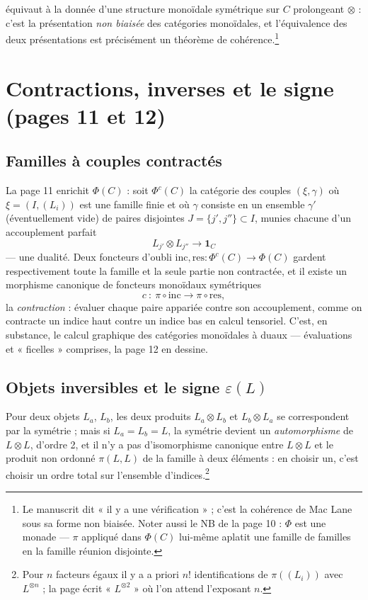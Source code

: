 \documentclass[11pt,a4paper]{article}
\begin{document}
équivaut à la donnée d'une structure monoïdale symétrique sur $C$
prolongeant $\otimes$ : c'est la présentation \emph{non biaisée} des
catégories monoïdales, et l'équivalence des deux présentations est
précisément un théorème de cohérence.\footnote{Le manuscrit dit « il y a
une vérification » ; c'est la cohérence de Mac Lane sous sa forme non
biaisée. Noter aussi le NB de la page 10 : $\Phi$ est une monade —
$\pi$ appliqué dans $\Phi(C)$ lui-même aplatit une famille de familles en
la famille réunion disjointe.}

\section*{Contractions, inverses et le signe (pages 11 et 12)}

\subsection*{Familles à couples contractés}

La page 11 enrichit $\Phi(C)$ : soit $\Phi^{c}(C)$ la catégorie des
couples $(\xi, \gamma)$ où $\xi = (I, (L_i))$ est une famille finie et où
$\gamma$ consiste en un ensemble $\gamma'$ (éventuellement vide) de paires
disjointes $J = \{j', j''\} \subset I$, munies chacune d'un accouplement
parfait
\[
L_{j'} \otimes L_{j''} \longrightarrow \mathbf{1}_C
\]
— une dualité. Deux foncteurs d'oubli
$\mathrm{inc}, \mathrm{res} : \Phi^{c}(C) \to \Phi(C)$ gardent
respectivement toute la famille et la seule partie non contractée, et il
existe un morphisme canonique de foncteurs monoïdaux symétriques
\[
c\ :\ \pi \circ \mathrm{inc} \longrightarrow \pi \circ \mathrm{res},
\]
la \emph{contraction} : évaluer chaque paire appariée contre son
accouplement, comme on contracte un indice haut contre un indice bas en
calcul tensoriel. C'est, en substance, le calcul graphique des catégories
monoïdales à duaux — évaluations et « ficelles » comprises, la page 12
en dessine.

\subsection*{Objets inversibles et le signe $\varepsilon(L)$}

Pour deux objets $L_a$, $L_b$, les deux produits $L_a \otimes L_b$ et
$L_b \otimes L_a$ se correspondent par la symétrie ; mais si
$L_a = L_b = L$, la symétrie devient un \emph{automorphisme} de
$L \otimes L$, d'ordre 2, et il n'y a pas d'isomorphisme canonique entre
$L \otimes L$ et le produit non ordonné $\pi(L, L)$ de la famille à deux
éléments : en choisir un, c'est choisir un ordre total sur l'ensemble
d'indices.\footnote{Pour $n$ facteurs égaux il y a a priori $n!$
identifications de $\pi((L_i))$ avec $L^{\otimes n}$ ; la page écrit
« $L^{\otimes 2}$ » où l'on attend l'exposant $n$.}
\end{document}
